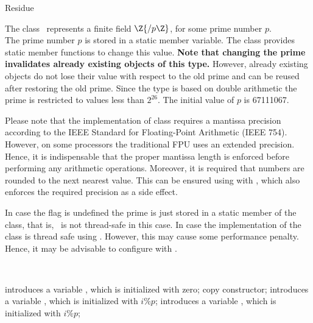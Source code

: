 \begin{ccRefClass} {Residue}
\label{Residue}

\def\ccTagOperatorLayout{\ccTrue}

\ccDefinition

The class \ccRefName\ represents a finite field $\Z{/p\Z}$, 
for some prime number $p$. \\

The prime number $p$ is stored in a static member variable. 
The class provides static member functions to change this value. 
{\bf Note that changing the prime invalidates already existing objects 
of this type.}
However, already existing objects do not lose their value with respect to the 
old prime and can be reused after restoring the old prime. 
Since the type is based on double 
arithmetic the prime is restricted to values less than $2^{26}$. 
The initial value of $p$ is 67111067. 
 
Please note that the implementation of class  requires a mantissa 
precision according to the IEEE Standard for Floating-Point Arithmetic (IEEE 754). 
However, on some processors the traditional FPU uses an extended precision. Hence, it 
is  indispensable that the proper mantissa length is enforced before performing 
any arithmetic operations. Moreover, it is required that numbers are rounded to the 
next nearest value. This can be ensured using  with 
, which also enforces the required precision as a side effect. 

In case the flag  
is undefined the prime is just stored in a static member 
of the class, that is, \ccRefName\ is not thread-safe in this case.  
In case 
the implementation of the class is thread safe using 
. However, this may cause some performance 
penalty. Hence, it may be advisable to configure  with 
. 


\ccIsModel
{}\\


\ccCreation
{}

{introduces a variable \ccVar, which is initialized with zero;}
\ccGlue
{}
{copy constructor;}
\ccGlue
{}
{introduces a variable \ccVar, which is initialized with $i \%  p$;}
\ccGlue
{}
{introduces a variable \ccVar, which is initialized with $i \%  p$;}


\end{ccRefClass}
